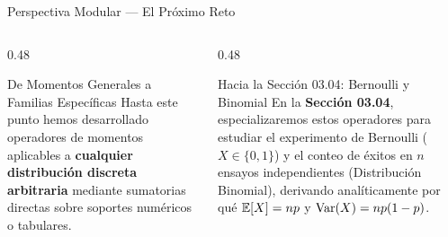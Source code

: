 \documentclass[10pt, aspectratio=169]{beamer}
\begin{document}
\begin{frame}{Perspectiva Modular — El Próximo Reto}
  \begin{columns}[T]
    \begin{column}{0.48\textwidth}
      \begin{block}{De Momentos Generales a Familias Específicas}
        \footnotesize
        Hasta este punto hemos desarrollado operadores de momentos aplicables a \textbf{cualquier distribución discreta arbitraria} mediante sumatorias directas sobre soportes numéricos o tabulares.
      \end{block}
    \end{column}
    \begin{column}{0.48\textwidth}
      \pause
      \begin{alertblock}{Hacia la Sección 03.04: Bernoulli y Binomial}
        \footnotesize
        En la \textbf{Sección 03.04}, especializaremos estos operadores para estudiar el experimento de Bernoulli ($X \in \{0, 1\}$) y el conteo de éxitos en $n$ ensayos independientes (Distribución Binomial), derivando analíticamente por qué $\mathbb{E}[X] = np$ y $\operatorname{Var}(X) = np(1-p)$.
      \end{alertblock}
    \end{column}
  \end{columns}
\end{frame}
\end{document}
